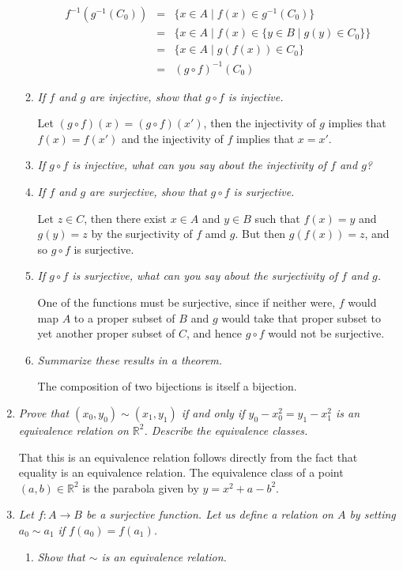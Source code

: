 \documentclass[letterpaper, 11pt]{article}
\newcommand{\R}{\mathbb{R}}
\begin{document}
\begin{enumerate}
\begin{enumerate}
\begin{eqnarray*}
f^{-1}(g^{-1}(C_0)) &=& \{x \in A \mid f(x) \in g^{-1}(C_0)\} \\
&=& \{x \in A \mid f(x) \in \{y \in B \mid g(y) \in C_0\}\} \\
&=& \{x \in A \mid g(f(x)) \in C_0\} \\
&=& (g \circ f)^{-1}(C_0)
\end{eqnarray*}
\item \emph{If $f$ and $g$ are injective, show that $g \circ f$ is injective.}

Let $(g \circ f)(x) = (g \circ f)(x')$, then the injectivity of $g$ implies that $f(x) = f(x')$ and the injectivity of $f$ implies that $x = x'$.

\item \emph{If $g \circ f$ is injective, what can you say about the injectivity of $f$ and $g$?}

\item \emph{If $f$ and $g$ are surjective, show that $g \circ f$ is surjective.}

Let $z \in C$, then there exist $x \in A$ and $y \in B$ such that $f(x) = y$ and $g(y) = z$ by the surjectivity of $f$ amd $g$.  But then $g(f(x)) = z$, and so $g \circ f$ is surjective.
\item \emph{If $g \circ f$ is surjective, what can you say about the surjectivity of $f$ and $g$.}

One of the functions must be surjective, since if neither were, $f$ would map $A$ to a proper subset of $B$ and $g$ would take that proper subset to yet another proper subset of $C$, and hence $g \circ f$ would not be surjective.

\item \emph{Summarize these results in a theorem.}

The composition of two bijections is itself a bijection.

\end{enumerate}

\item \emph{Prove that $(x_0, y_0) \sim (x_1, y_1)$ if and only if $y_0 - x_0^2 = y_1 - x_1^2$ is an equivalence relation on $\R^2$.  Describe the equivalence classes.}

That this is an equivalence relation follows directly from the fact that equality is an equivalence relation.  The equivalence class of a point $(a,b) \in \R^2$ is the parabola given by $y = x^2 + a - b^2$.

\item \emph{Let $f: A \rightarrow B$ be a surjective function.  Let us define a relation on $A$ by setting $a_0 \sim a_1$ if $f(a_0) = f(a_1)$.}
\begin{enumerate}
\item \emph{Show that $\sim$ is an equivalence relation.}


\end{enumerate}
\end{enumerate}
\end{document}
